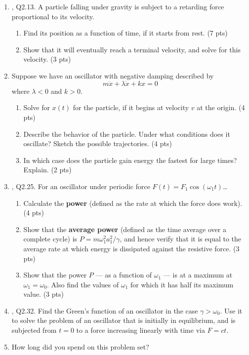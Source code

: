 \documentclass[../psets.tex]{subfiles}
\begin{document}
\begin{enumerate}
\begin{enumerate}
    \end{enumerate}
    \item \textcite{bib:KibbleBerkshire}, Q2.13. A particle falling under gravity is subject to a retarding force proportional to its velocity.
    \begin{enumerate}
        \item Find its position as a function of time, if it starts from rest. (7 pts)
        \item Show that it will eventually reach a terminal velocity, and solve for this velocity. (3 pts)
    \end{enumerate}
    \item Suppose we have an oscillator with negative damping described by
    \begin{equation*}
        m\ddot{x}+\lambda\dot{x}+kx = 0
    \end{equation*}
    where $\lambda<0$ and $k>0$.
    \begin{enumerate}
        \item Solve for $x(t)$ for the particle, if it begins at velocity $v$ at the origin. (4 pts)
        \item Describe the behavior of the particle. Under what conditions does it oscillate? Sketch the possible trajectories. (4 pts)
        \item In which case does the particle gain energy the fastest for large times? Explain. (2 pts)
    \end{enumerate}
    \item \textcite{bib:KibbleBerkshire}, Q2.25. For an oscillator under periodic force $F(t)=F_1\cos(\omega_1t)$\dots
    \begin{enumerate}
        \item Calculate the \textbf{power} (defined as the rate at which the force does work). (4 pts)
        \item Show that the \textbf{average power} (defined as the time average over a complete cycle) is $P=m\omega_1^2a_1^2/\gamma$, and hence verify that it is equal to the average rate at which energy is dissipated against the resistive force. (3 pts)
        \item Show that the power $P$ --- as a function of $\omega_1$ --- is at a maximum at $\omega_1=\omega_0$. Also find the values of $\omega_1$ for which it has half its maximum value. (3 pts)
    \end{enumerate}
    \item \textcite{bib:KibbleBerkshire}, Q2.32. Find the Green's function of an oscillator in the case $\gamma>\omega_0$. Use it to solve the problem of an oscillator that is initially in equilibrium, and is subjected from $t=0$ to a force increasing linearly with time via $F=ct$.
    \item How long did you spend on this problem set?
\end{enumerate}
\end{document}
